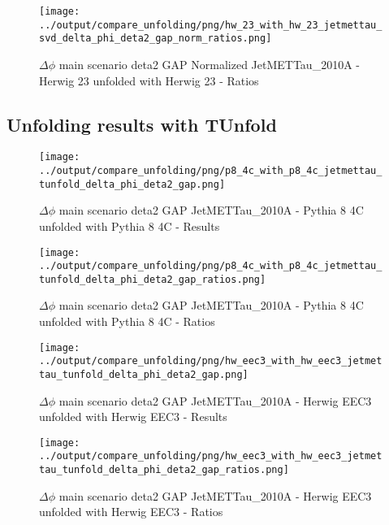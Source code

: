 \documentclass[11pt]{book}
\begin{document}
\begin{figure}[ht]
\centering
\texttt{[image: ../output/compare\_unfolding/png/hw\_23\_with\_hw\_23\_jetmettau\_svd\_delta\_phi\_deta2\_gap\_norm\_ratios.png]}
\caption{$\Delta\phi$ main scenario deta2 GAP Normalized JetMETTau\_2010A - Herwig 23 unfolded with Herwig 23 - Ratios}
\label{hw_23_hw_23_jetmettau_svd_delta_phi_deta2_gap_norm_b}
\end{figure}



\clearpage
\subsection{Unfolding results with TUnfold}

\begin{figure}[ht]
\centering
\texttt{[image: ../output/compare\_unfolding/png/p8\_4c\_with\_p8\_4c\_jetmettau\_tunfold\_delta\_phi\_deta2\_gap.png]}
\caption{$\Delta\phi$ main scenario deta2 GAP JetMETTau\_2010A - Pythia 8 4C unfolded with Pythia 8 4C - Results}
\label{p8_p8_jetmettau_tunfold_delta_phi_deta2_gap_a}
\end{figure}

\begin{figure}[ht]
\centering
\texttt{[image: ../output/compare\_unfolding/png/p8\_4c\_with\_p8\_4c\_jetmettau\_tunfold\_delta\_phi\_deta2\_gap\_ratios.png]}
\caption{$\Delta\phi$ main scenario deta2 GAP JetMETTau\_2010A - Pythia 8 4C unfolded with Pythia 8 4C - Ratios}
\label{p8_p8_jetmettau_tunfold_delta_phi_deta2_gap_b}
\end{figure}

\begin{figure}[ht]
\centering
\texttt{[image: ../output/compare\_unfolding/png/hw\_eec3\_with\_hw\_eec3\_jetmettau\_tunfold\_delta\_phi\_deta2\_gap.png]}
\caption{$\Delta\phi$ main scenario deta2 GAP JetMETTau\_2010A - Herwig EEC3 unfolded with Herwig EEC3 - Results}
\label{hw_eec3_hw_eec3_jetmettau_tunfold_delta_phi_deta2_gap_a}
\end{figure}

\begin{figure}[ht]
\centering
\texttt{[image: ../output/compare\_unfolding/png/hw\_eec3\_with\_hw\_eec3\_jetmettau\_tunfold\_delta\_phi\_deta2\_gap\_ratios.png]}
\caption{$\Delta\phi$ main scenario deta2 GAP JetMETTau\_2010A - Herwig EEC3 unfolded with Herwig EEC3 - Ratios}
\label{hw_eec3_hw_eec3_jetmettau_tunfold_delta_phi_deta2_gap_b}
\end{figure}
\end{document}
